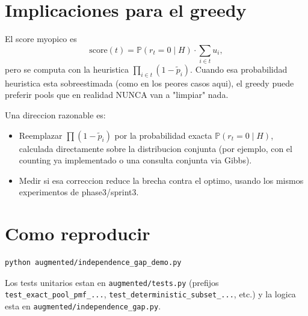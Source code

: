 \documentclass[11pt]{article}
\begin{document}
\section{Implicaciones para el greedy}

El score myopico es
\[
\text{score}(t) = \mathbb{P}(r_t = 0 \mid H) \cdot \sum_{i \in t} u_i,
\]
pero se computa con la heuristica
$\prod_{i \in t}(1 - \tilde p_i)$. Cuando esa probabilidad heuristica
esta sobreestimada (como en los peores casos aqui), el greedy puede
preferir pools que en realidad NUNCA van a "limpiar" nada.

Una direccion razonable es:
\begin{itemize}
  \item Reemplazar $\prod (1 - \tilde p_i)$ por la probabilidad exacta
    $\mathbb{P}(r_t = 0 \mid H)$, calculada directamente sobre la
    distribucion conjunta (por ejemplo, con el counting ya implementado
    o una consulta conjunta via Gibbs).
  \item Medir si esa correccion reduce la brecha contra el optimo,
    usando los mismos experimentos de phase3/sprint3.
\end{itemize}

\section{Como reproducir}

\begin{verbatim}
python augmented/independence_gap_demo.py
\end{verbatim}

Los tests unitarios estan en \texttt{augmented/tests.py}
(prefijos \texttt{test\_exact\_pool\_pmf\_...},
\texttt{test\_deterministic\_subset\_...}, etc.) y la logica esta en
\texttt{augmented/independence\_gap.py}.
\end{document}
